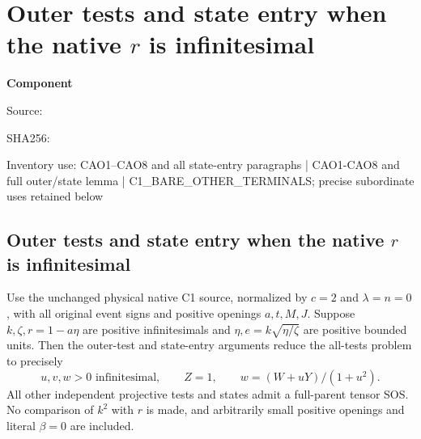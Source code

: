 \chapter{Outer tests and state entry when the native $r$ is infinitesimal}
\label{component:p364e14238053}
\noindent\textbf{Component }\par
{\small\noindent Source: \par}
{\small\noindent SHA256: \par}
{\small\noindent Inventory use: CAO1--CAO8 and all state-entry paragraphs | CAO1-CAO8 and full outer/state lemma | C1\_\allowbreak{}BARE\_\allowbreak{}OTHER\_\allowbreak{}TERMINALS; precise subordinate uses retained below\par}
\medskip
\section[Outer tests and state entry when the native r is infinitesimal]{Outer tests and state entry when the native $r$ is infinitesimal}
\label{p364e14238053:sec:centered-a-outer}

\begin{lemma}
Use the unchanged physical native C1 source, normalized by $c=2$ and
$\lambda=n=0$, with all original event signs and positive openings
$a,t,M,J$. Suppose $k,\zeta,r=1-a\eta$ are positive infinitesimals and
$\eta,e=k\sqrt{\eta/\zeta}$ are positive bounded units.
Then the outer-test and state-entry arguments reduce the all-tests
problem to precisely
\[
 u,v,w>0\text{ infinitesimal},\qquad Z=1,
 \qquad w=(W+uY)/(1+u^2).
 \tag{CAO1}
\]
All other independent projective tests and states admit a full-parent
tensor SOS. No comparison of $k^2$ with $r$ is made, and arbitrarily
small positive openings and literal $\beta=0$ are included.
\end{lemma}

